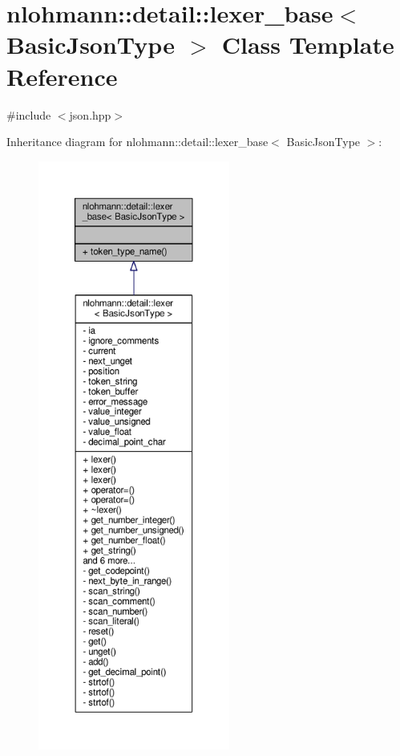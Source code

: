 \hypertarget{classnlohmann_1_1detail_1_1lexer__base}{}\section{nlohmann\+:\+:detail\+:\+:lexer\+\_\+base$<$ Basic\+Json\+Type $>$ Class Template Reference}
\label{classnlohmann_1_1detail_1_1lexer__base}


{\ttfamily \#include $<$json.\+hpp$>$}



Inheritance diagram for nlohmann\+:\+:detail\+:\+:lexer\+\_\+base$<$ Basic\+Json\+Type $>$\+:
\nopagebreak
\begin{figure}[H]
\begin{center}
\leavevmode
\includegraphics[height=550pt]{classnlohmann_1_1detail_1_1lexer__base__inherit__graph}
\end{center}
\end{figure}


